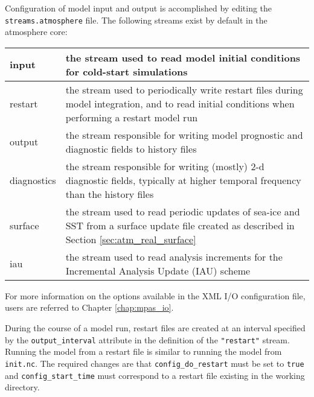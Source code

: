 Configuration of model input and output is accomplished by editing the {\tt streams.atmosphere} file. The following streams exist by default in the atmosphere
core:

\begin{longtable}{|p{1.25in} |p{5.0in}|}
\hline
   input        & the stream used to read model initial conditions for cold-start simulations \\ \hline
   restart      & the stream used to periodically write restart files during model integration, and to read initial conditions when performing a restart model run \\ \hline
   output      & the stream responsible for writing model prognostic and diagnostic fields to history files \\ \hline
   diagnostics & the stream responsible for writing (mostly) 2-d diagnostic fields, typically at higher temporal frequency than the history files \\ \hline
   surface    & the stream used to read periodic updates of sea-ice and SST from a surface update file created as described in Section 
\ref{sec:atm_real_surface} \\ \hline
   iau          & the stream used to read analysis increments for the Incremental Analysis Update (IAU) scheme \\ \hline
\end{longtable}

\noindent For more information on the options available in the XML I/O configuration file, users are referred to Chapter \ref{chap:mpas_io}.

During the course of a model run, restart files are created at an interval specified by the {\tt output\_interval} attribute in the definition of the {\tt "restart"} stream. Running the model from a restart file is similar to running the model from {\tt init.nc}.  The required changes are that {\tt config\_do\_restart} must be set to {\tt true} and {\tt config\_start\_time} must correspond to a restart file existing in the working directory.

